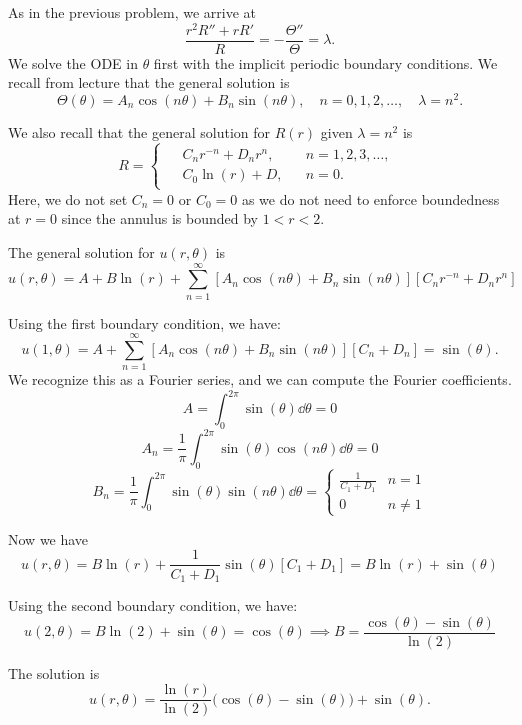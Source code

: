 \documentclass[plain]{pset}
\begin{document}
\begin{solution}
    As in the previous problem, we arrive at
    \[\frac{r^2R'' + rR'}{R} = -\frac{\Theta''}{\Theta} = \lambda.\]
    We solve the ODE in \(\theta\) first with the implicit periodic boundary conditions. We recall from lecture that the general solution is
    \[\Theta(\theta) = A_n\cos(n\theta) + B_n\sin(n\theta), \quad n = 0, 1, 2, \ldots, \quad \lambda = n^2.\]

    We also recall that the general solution for \(R(r)\) given \(\lambda = n^2\) is
    \[R =
        \begin{cases}
            \begin{aligned}
                 & C_n r^{-n} + D_nr^n, &  & n = 1, 2, 3, \ldots, \\
                 & C_0\ln(r) + D,       &  & n = 0.
            \end{aligned}
        \end{cases}
    \]
    Here, we do not set \(C_n = 0\) or \(C_0 = 0\) as we do not need to enforce boundedness at \(r = 0\) since the annulus is bounded by \(1 < r < 2\).

    The general solution for \(u(r, \theta)\) is
    \[u(r, \theta) = A + B\ln(r) + \sum_{n = 1}^\infty \left[A_n\cos(n\theta) + B_n\sin(n\theta)\right]\left[C_nr^{-n} + D_nr^n\right]\]

    Using the first boundary condition, we have:
    \[u(1, \theta) = A + \sum_{n = 1}^\infty \left[A_n\cos(n\theta) + B_n\sin(n\theta)\right]\left[C_n + D_n\right] = \sin(\theta).\]
    We recognize this as a Fourier series, and we can compute the Fourier coefficients.
    \[A = \int_0^{2\pi} \sin(\theta) \dd{\theta} = 0\]
    \[A_n = \frac{1}{\pi}\int_0^{2\pi} \sin(\theta)\cos(n\theta) \dd{\theta} = 0\]
    \[B_n = \frac{1}{\pi}\int_0^{2\pi} \sin(\theta)\sin(n\theta) \dd{\theta} = \begin{cases} \frac{1}{C_1 + D_1} & n = 1 \\ 0 & n \neq 1 \end{cases}\]

    Now we have
    \[u(r, \theta) = B\ln(r) + \frac{1}{C_1 + D_1}\sin(\theta)\left[C_1 + D_1\right] = B\ln(r) + \sin(\theta)\]

    Using the second boundary condition, we have:
    \[u(2, \theta) = B\ln(2) + \sin(\theta) = \cos(\theta) \implies B = \frac{\cos(\theta) - \sin(\theta)}{\ln(2)}\]

    The solution is
    \[u(r, \theta) = \frac{\ln(r)}{\ln(2)}\bigl(\cos(\theta) - \sin(\theta)\bigr) + \sin(\theta).\]

\end{solution}
\end{document}
